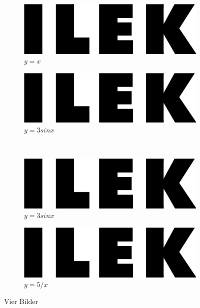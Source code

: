 \begin{figure}[H]
	\centering
	\begin{subfigure}[b]{0.3\textwidth}
		\centering
		\includegraphics[width=\textwidth]{Images/ILEK-logo.jpg}
		\caption{$y=x$}
		\label{fig:a}
	\end{subfigure}
\hspace{1cm}
	\begin{subfigure}[b]{0.3\textwidth}
		\centering
		\includegraphics[width=\textwidth]{Images/ILEK-logo.jpg}
		\caption{$y=3sinx$}
		\label{fig:b}
	\end{subfigure}
	\\ 
	\begin{subfigure}[b]{0.3\textwidth}
		\centering
		\includegraphics[width=\textwidth]{Images/ILEK-logo.jpg}
		\caption{$y=3sinx$}
		\label{fig:c}
	\end{subfigure}
\hspace{1cm}
	\begin{subfigure}[b]{0.3\textwidth}
		\centering
		\includegraphics[width=\textwidth]{Images/ILEK-logo.jpg}
		\caption{$y=5/x$}
		\label{fig:five over x}
	\end{subfigure}
	\caption{Vier Bilder}
	\label{fig:d}
\end{figure}

